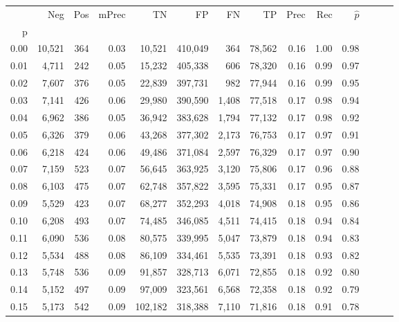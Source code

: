 \begin{tabular}{rrrrrrrrrrrrrr}
\toprule
{} &     Neg &    Pos & mPrec &       TN &       FP &      FN &      TP &  Prec &   Rec & $\hat{p}$ \\
p    &         &        &       &          &          &         &         &       &       &           \\
\midrule
0.00 &  10,521 &    364 &  0.03 &   10,521 &  410,049 &     364 &  78,562 &  0.16 &  1.00 &      0.98 \\
0.01 &   4,711 &    242 &  0.05 &   15,232 &  405,338 &     606 &  78,320 &  0.16 &  0.99 &      0.97 \\
0.02 &   7,607 &    376 &  0.05 &   22,839 &  397,731 &     982 &  77,944 &  0.16 &  0.99 &      0.95 \\
0.03 &   7,141 &    426 &  0.06 &   29,980 &  390,590 &   1,408 &  77,518 &  0.17 &  0.98 &      0.94 \\
0.04 &   6,962 &    386 &  0.05 &   36,942 &  383,628 &   1,794 &  77,132 &  0.17 &  0.98 &      0.92 \\
0.05 &   6,326 &    379 &  0.06 &   43,268 &  377,302 &   2,173 &  76,753 &  0.17 &  0.97 &      0.91 \\
0.06 &   6,218 &    424 &  0.06 &   49,486 &  371,084 &   2,597 &  76,329 &  0.17 &  0.97 &      0.90 \\
0.07 &   7,159 &    523 &  0.07 &   56,645 &  363,925 &   3,120 &  75,806 &  0.17 &  0.96 &      0.88 \\
0.08 &   6,103 &    475 &  0.07 &   62,748 &  357,822 &   3,595 &  75,331 &  0.17 &  0.95 &      0.87 \\
0.09 &   5,529 &    423 &  0.07 &   68,277 &  352,293 &   4,018 &  74,908 &  0.18 &  0.95 &      0.86 \\
0.10 &   6,208 &    493 &  0.07 &   74,485 &  346,085 &   4,511 &  74,415 &  0.18 &  0.94 &      0.84 \\
0.11 &   6,090 &    536 &  0.08 &   80,575 &  339,995 &   5,047 &  73,879 &  0.18 &  0.94 &      0.83 \\
0.12 &   5,534 &    488 &  0.08 &   86,109 &  334,461 &   5,535 &  73,391 &  0.18 &  0.93 &      0.82 \\
0.13 &   5,748 &    536 &  0.09 &   91,857 &  328,713 &   6,071 &  72,855 &  0.18 &  0.92 &      0.80 \\
0.14 &   5,152 &    497 &  0.09 &   97,009 &  323,561 &   6,568 &  72,358 &  0.18 &  0.92 &      0.79 \\
0.15 &   5,173 &    542 &  0.09 &  102,182 &  318,388 &   7,110 &  71,816 &  0.18 &  0.91 &      0.78 \\

\end{tabular}
